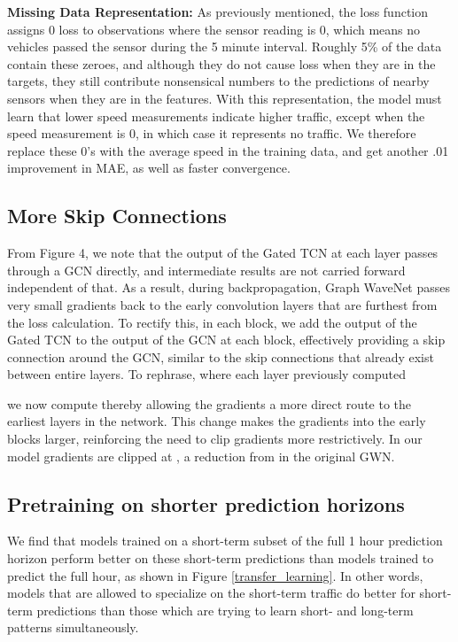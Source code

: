 \documentclass[10pt]{article}
\begin{document}
\textbf{Missing Data Representation:} As previously mentioned, the loss function assigns 0 loss to observations where the sensor reading is 0, which means no vehicles passed the sensor during the 5 minute interval. Roughly 5\% of the data contain these zeroes, and although they do not cause loss when they are in the targets,  they still contribute nonsensical numbers to the predictions of nearby sensors when they are in the features. With this representation,  the model must learn that lower speed measurements indicate higher traffic, except when the speed measurement is 0, in which case it represents no traffic. We therefore replace these 0's with the average speed in the training data, and get another .01 improvement in MAE, as well as faster convergence. 

\subsection{More Skip Connections}
From Figure 4, we note that the output of the Gated TCN at each layer passes through a GCN directly, and intermediate results are not carried forward independent of that. As a result, during backpropagation, Graph WaveNet passes very small gradients back to the early convolution layers that are furthest from the loss calculation. To rectify this, in each block, we add the output of the Gated TCN to the output of the GCN at each block, effectively providing a skip connection around the GCN, similar to the skip connections that already exist between entire layers. To rephrase, where each layer previously computed 

we now compute  thereby allowing the gradients a more direct route to the earliest layers in the network. This change makes the gradients into the early blocks larger, reinforcing the need to clip gradients more restrictively. In our model gradients are clipped at , a reduction from  in the original GWN.

\subsection{Pretraining on shorter prediction horizons}

We find that models trained on a short-term subset of the full 1 hour prediction horizon perform better on these short-term predictions than models trained to predict the full hour, as shown in Figure \ref{transfer_learning}. In other words, models that are allowed to specialize on the short-term traffic do better for short-term predictions than those which are trying to learn short- and long-term patterns simultaneously.
\end{document}
